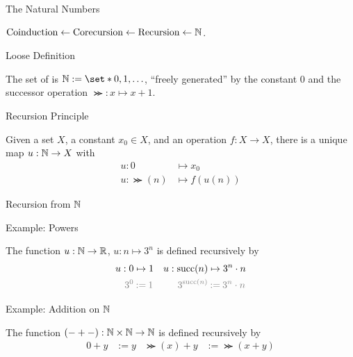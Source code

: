 
\begin{frame}{The Natural Numbers}
  
  \par $\text{Coinduction} \leftarrow \text{Corecursion} \leftarrow \text{Recursion} \leftarrow \mathbb{N}$.

  \pause

  \begin{block}{Loose Definition}
    \par The set of  is $\N := \set*{0, 1, \dots}$, ``freely generated'' by the constant $0$ and the successor operation $\Succ : x \mapsto x + 1$.
  \end{block}

  \pause

  \begin{block}{Recursion Principle}
    \par Given a set $X$, a constant $x_0 \in X$, and an operation $f : X \to X$, there is a unique map $u : \mathbb{N} \to X$ with
    \begin{align*}
      u : 0 &\mapsto x_0 \\
      u : \Succ (n) &\mapsto f (u (n))
    \end{align*}
  \end{block}

\end{frame}

\begin{frame}{Recursion from $\mathbb{N}$}

  \begin{block}{Example: Powers}
    \par The function $u : \mathbb{N} \to \mathbb{R}$, $u : n \mapsto 3^n$ is defined recursively by
    \begin{align*}
      u : 0 &\mapsto 1
      & u : \Succ (n) &\mapsto 3^n \cdot n
      \\
      \textcolor{gray}{3^0} &\mathbin{\textcolor{gray}{:=}} \textcolor{gray}{1}
      & \textcolor{gray}{3^{\Succ (n)}} &\mathbin{\textcolor{gray}{:=}} \textcolor{gray}{3^n \cdot n}
    \end{align*}
  \end{block}

  \begin{block}{Example: Addition on $\mathbb{N}$}
    \par The function $({-} + {-}) : \mathbb{N} \times \mathbb{N} \to \mathbb{N}$ is defined recursively by
    \begin{align*}
      0 + y           &:= y
      & \Succ(x) + y  &:= \Succ(x + y)
    \end{align*}
  \end{block}

\end{frame}
